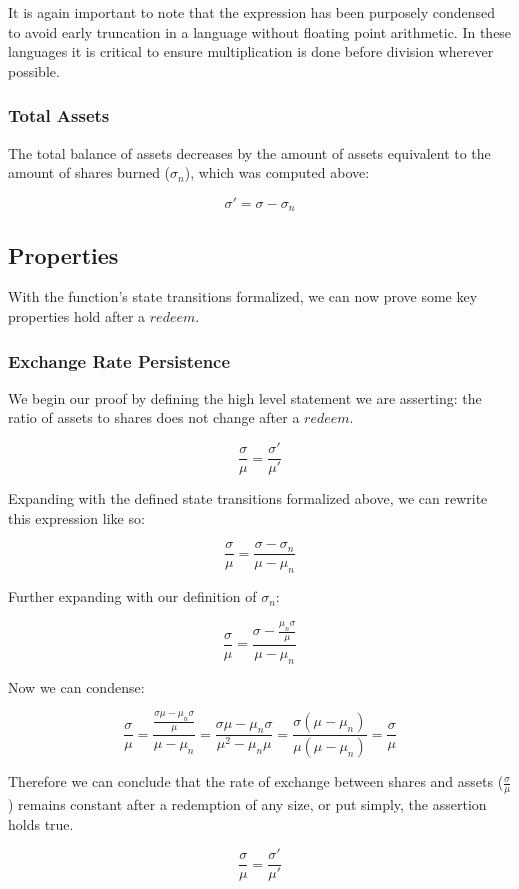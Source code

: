\documentclass{article}
\begin{document}
It is again important to note that the expression has been purposely condensed to avoid early truncation in a language without floating point arithmetic. In these languages it is critical to ensure multiplication is done before division wherever possible.

\subsubsection{Total Assets}

The total balance of assets decreases by the amount of assets equivalent to the amount of shares burned ($\sigma_n$), which was computed above:

$$ \sigma' = \sigma - \sigma_n $$

\subsection{Properties}

With the function's state transitions formalized, we can now prove some key properties hold after a $redeem$.

\subsubsection{Exchange Rate Persistence}

We begin our proof by defining the high level statement we are asserting: the ratio of assets to shares does not change after a $redeem$.

$$ \frac{\sigma}{\mu} = \frac{\sigma'}{\mu'} $$

Expanding with the defined state transitions formalized above, we can rewrite this expression like so:

$$ \frac{\sigma}{\mu} = \frac{\sigma - \sigma_n}{\mu - \mu_n} $$

Further expanding with our definition of $\sigma_n$:

$$ \frac{\sigma}{\mu} = \frac{\sigma - \frac{\mu_n\sigma}{\mu}}{\mu - \mu_n} $$

Now we can condense:

$$ \frac{\sigma}{\mu} = \frac{\frac{\sigma\mu - \mu_n\sigma}{\mu}}{\mu - \mu_n} = \frac{\sigma\mu - \mu_n\sigma}{\mu^{2} - \mu_n\mu} = \frac{\sigma(\mu - \mu_n)}{\mu(\mu - \mu_n)} = \frac{\sigma}{\mu} $$

Therefore we can conclude that the rate of exchange between shares and assets ($\frac{\sigma}{\mu}$) remains constant after a redemption of any size, or put simply, the assertion holds true.

$$ \frac{\sigma}{\mu} = \frac{\sigma'}{\mu'} $$
\end{document}

